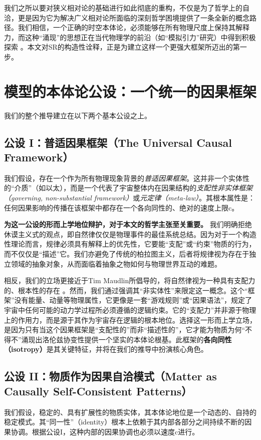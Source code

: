 \documentclass[12pt, a4paper]{article}
\begin{document}
我们之所以要对狭义相对论的基础进行如此彻底的重构，不仅是为了哲学上的自洽，更是因为它为解决广义相对论所面临的深刻哲学困境提供了一条全新的概念路径。我们相信，一个正确的时空本体论，必须能够在所有物理尺度上保持其解释力，而这种``涌现''的思想正在当代物理学的前沿（如``模拟引力''研究）中得到积极探索 \cite{Barcelo2005}。本文对SR的构造性诠释，正是为建立这样一个更强大框架所迈出的第一步。

\section{模型的本体论公设：一个统一的因果框架}

我们的整个推导建立在以下两个基本公设之上。

\subsection{公设 I：普适因果框架（The Universal Causal Framework）}
我们假设，存在一个作为所有物理现象背景的\textit{普适因果框架}。这并非一个实体性的``介质''（如以太），而是一个代表了宇宙整体内在因果结构的\textit{支配性非实体框架（governing, non-substantial framework）}或\textit{元定律（meta-law）}。其根本属性是：任何因果影响的传播在该框架中都存在一个各向同性的、绝对的速度上限c。

\textbf{为这一公设的形而上学地位辩护，对于本文的哲学主张至关重要。} 我们明确拒绝休谟主义式的观点，即自然律仅仅是物理事件的最佳系统总结。因为对于一个构造性理论而言，规律必须具有解释上的优先性，它要能``支配''或``约束''物质的行为，而不仅仅是``描述''它。我们亦避免了传统的柏拉图主义，后者将规律视为存在于独立领域的抽象对象，从而面临着抽象之物如何与物理世界互动的难题。

相反，我们的立场更接近于Tim Maudlin所倡导的，将自然律视为一种具有支配力的、根本性的存在 \cite{Maudlin2007}。然而，我们通过强调其``非实体性''来限定这一概念。这个``框架''没有能量、动量等物理属性，它更像是一套``游戏规则''或``因果语法''，规定了宇宙中任何可能的动力学过程所必须遵循的逻辑约束。它的``支配力''并非源于物理上的作用力，而是源于其作为宇宙存在逻辑的根本地位。选择这一形而上学立场，是因为只有当这个因果框架是``支配性的''而非``描述性的''，它才能为物质为何``不得不''涌现出洛伦兹协变性提供一个坚实的本体论根基。此框架的\textbf{各向同性（isotropy）}是其关键特征，并将在我们的推导中扮演核心角色。

\subsection{公设 II：物质作为因果自洽模式（Matter as Causally Self-Consistent Patterns）}
我们假设，稳定的、具有扩展性的物质实体，其本体论地位是一个动态的、自持的稳定模式。其``同一性''（identity）根本上依赖于其内部各部分之间持续不断的因果协调。根据公设I，这种内部的因果协调也必须以速度c进行。
\end{document}

